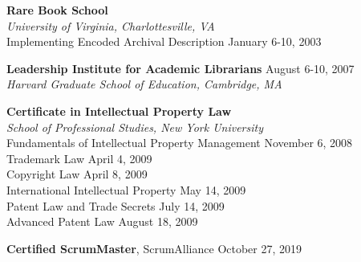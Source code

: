 \documentclass[10pt]{res} %
\begin{document}
\begin{resume}
\vspace{8pt} %

{\bf Rare Book School} \\
{\sl University of Virginia, Charlottesville, VA } \\
Implementing Encoded Archival Description \hfill January 6-10, 2003 

{\bf Leadership Institute for Academic Librarians} \hfill August 6-10, 2007 \\
{\sl Harvard Graduate School of Education, Cambridge, MA } 

{\bf Certificate in Intellectual Property Law} \\
{\sl School of Professional Studies, New York University} \\
Fundamentals of Intellectual Property Management \hfill November 6, 2008 \\
Trademark Law \hfill April 4, 2009 \\
Copyright Law \hfill April 8, 2009 \\
International Intellectual Property \hfill  May 14, 2009 \\
Patent Law and Trade Secrets \hfill July 14, 2009 \\
Advanced Patent Law \hfill August 18, 2009

{\bf Certified ScrumMaster}, ScrumAlliance \hfill October 27, 2019


\end{resume}
\end{document}
